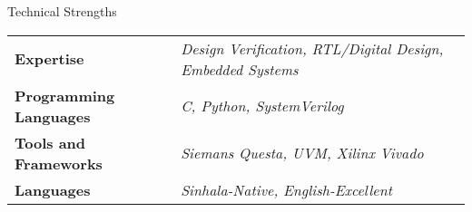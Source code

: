\documentclass[
	11pt, %
]{resume} %
\begin{document}
	




\begin{rSection}{Technical Strengths}

	\def\arraystretch{1.5}

	\begin{tabular}{ l l}
		\textbf{Expertise} & \emph{Design Verification, RTL/Digital Design, Embedded Systems} \\
		\textbf{Programming Languages} & \emph{C, Python, SystemVerilog} \\
		\textbf{Tools and Frameworks} & \emph{Siemans Questa, UVM, Xilinx Vivado} \\ 
		\textbf{Languages} & \emph{Sinhala-Native, English-Excellent} \\
	\end{tabular}

\end{rSection}

\end{document}

